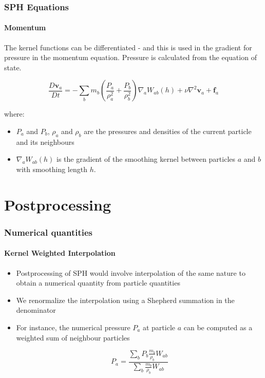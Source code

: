 \documentclass[notheorems, aspectratio=169]{beamer}
\begin{document}
    \begin{frame}[fragile]
      \frametitle{SPH Equations}
      \framesubtitle{Momentum}
      
      The kernel functions can be differentiated - and this is used in the gradient for pressure in the momentum equation. Pressure is calculated from the equation of state. 
      
      \begin{equation}
      \frac{D\mathbf{v}_a}{Dt} = -\sum_b m_b \left( \frac{P_a}{\rho_a^2} + \frac{P_b}{\rho_b^2} \right) \nabla_a W_{ab}(h)
      + \nu \nabla^2 \mathbf{v}_a + \mathbf{f}_a
      \end{equation}
      
      where:
      \begin{itemize}

        \item \( P_a \) and \( P_b \), \( \rho_a \) and \( \rho_b \) are the pressures and densities of the current particle and its neighbours 
        \item \( \nabla_a W_{ab}(h) \) is the gradient of the smoothing kernel between particles \( a \) and \( b \) with smoothing length \( h \).
      \end{itemize}
      
      \end{frame}

      
      \section{Postprocessing} 
      \frame{\tableofcontents[currentsection]}

      \begin{frame}

      \frametitle{Numerical quantities}
      \framesubtitle{Kernel Weighted Interpolation}
      
      \begin{itemize}
       \item Postprocessing of SPH would involve interpolation of the same nature to obtain a numerical quantity from particle quantities
       \item We renormalize the interpolation using a Shepherd summation in the denominator
        \item  For instance, the numerical pressure \(P_a\) at particle \(a\) can be computed as a weighted sum of neighbour particles

       \[
        P_a = \frac{\sum_b P_b \frac{m_b}{\rho_b} W_{ab}}{\sum_b \frac{m_b}{\rho_b} W_{ab}}
        \]

      \end{itemize}

      \end{frame}
\end{document}
